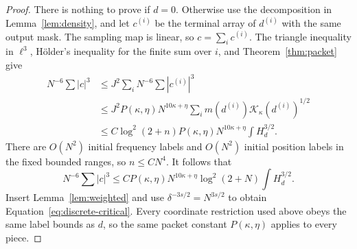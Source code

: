 \begin{proof}
There is nothing to prove if \(d=0\). Otherwise use the decomposition
in Lemma~\ref{lem:density}, and let \(c^{(i)}\) be the terminal array
of \(d^{(i)}\) with the same output mask. The sampling map is linear,
so \(c=\sum_i c^{(i)}\). The triangle inequality in \(\ell^3\),
H\"older's inequality for the finite sum over \(i\), and
Theorem~\ref{thm:packet} give
\[
\begin{split}
 N^{-6}\sum|c|^3
 &\le J^2\sum_i N^{-6}\sum|c^{(i)}|^3\\
 &\le J^2P(\kappa,\eta)N^{10\kappa+\eta}
        \sum_i m(d^{(i)})\mathcal K_\kappa(d^{(i)})^{1/2}\\
 &\le C\log^2(2+n)P(\kappa,\eta)N^{10\kappa+\eta}
        \int H_d^{3/2}.
\end{split}
\]
There are \(O(N^2)\) initial frequency labels and \(O(N^2)\) initial
position labels in the fixed bounded ranges, so \(n\le C N^4\).
It follows that
\begin{equation}\label{eq:packet-tube-comparison}
 N^{-6}\sum|c|^3
 \le C P(\kappa,\eta)N^{10\kappa+\eta}\log^2(2+N)
                        \int H_d^{3/2}.
\end{equation}
Insert Lemma~\ref{lem:weighted} and use
\(\delta^{-3s/2}=N^{3s/2}\) to obtain
Equation~\eqref{eq:discrete-critical}. Every coordinate restriction
used above obeys the same label bounds as \(d\), so the same packet
constant \(P(\kappa,\eta)\) applies to every piece.
\end{proof}

